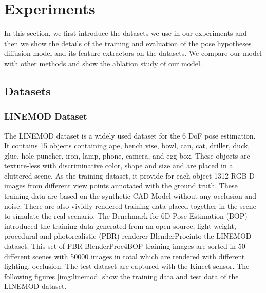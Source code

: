 \documentclass[12pt,DIV14,BCOR12mm,a4paper,footinclude=false,headinclude,parskip=half-,twoside,openright,cleardoublepage=empty,toc=index,bibliography=totoc,listof=totoc]{scrreprt}
\numberwithin{equation}{chapter}
\begin{document}
\section{Experiments}
In this section, we first introduce the datasets we use in our experiments and then we show the details of the training and evaluation of the pose hypotheses diffusion model and its feature extractors on the datasets. We compare our model with other methods and show the ablation study of our model.
\subsection{Datasets}
\subsubsection{LINEMOD Dataset}
The LINEMOD dataset \cite{hinterstoisser2012model} is a widely used dataset for the 6 DoF pose estimation. It contains 15 objects containing ape, bench vise, bowl, can, cat, driller, duck, glue, hole puncher, iron, lamp, phone, camera, and egg box. These objects are texture-less with discriminative color, shape and size and are placed in a cluttered scene. As the training dataset, it provide for each object 1312 RGB-D images from different view points annotated with the ground truth. These training data are based on the synthetic CAD Model without any occlusion and noise. There are also vividly rendered training data placed together in the scene to simulate the real scenario. The Benchmark for 6D Pose Estimation (BOP) \cite{hodan2018bop}introduced the training data generated from an open-source, light-weight, procedural and photorealistic (PBR) renderer BlenderProc\cite{denninger2019blenderproc}into the LINEMOD dataset.
This set of PBR-BlenderProc4BOP training images are sorted in 50 different scenes with 50000 images in total which are rendered with different lighting, occlusion. The test dataset are captured with the Kinect sensor. The following figures \ref{img:linemod} show the training data and test data of the LINEMOD dataset.
\end{document}
